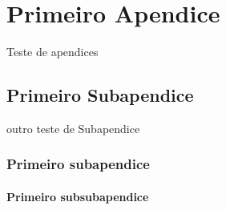 
\chapter{Primeiro Apendice}

Teste de apendices

\section{Primeiro Subapendice}
 outro teste de Subapendice
\subsection{Primeiro subapendice}

\subsubsection{Primeiro subsubapendice}
